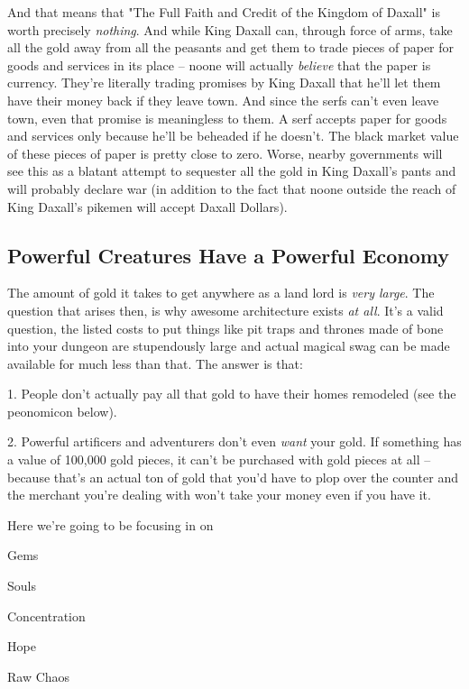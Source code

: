 And that means that "The Full Faith and Credit of the Kingdom of Daxall" is worth precisely \textit{nothing}. And while King Daxall can, through force of arms, take all the gold away from all the peasants and get them to trade pieces of paper for goods and services in its place -- noone will actually \textit{believe} that the paper is currency. They're literally trading promises by King Daxall that he'll let them have their money back if they leave town. And since the serfs can't even leave town, even that promise is meaningless to them. A serf accepts paper for goods and services only because he'll be beheaded if he doesn't. The black market value of these pieces of paper is pretty close to zero. Worse, nearby governments will see this as a blatant attempt to sequester all the gold in King Daxall's pants and will probably declare war (in addition to the fact that noone outside the reach of King Daxall's pikemen will accept Daxall Dollars).

\subsection{Powerful Creatures Have a Powerful Economy}

The amount of gold it takes to get anywhere as a land lord is \textit{very large}. The question that arises then, is why awesome architecture exists \textit{at all}. It's a valid question, the listed costs to put things like pit traps and thrones made of bone into your dungeon are stupendously large and actual magical swag can be made available for much less than that. The answer is that:

1. People don't actually pay all that gold to have their homes remodeled (see the peonomicon below).

2. Powerful artificers and adventurers don't even \textit{want} your gold. If something has a value of 100,000 gold pieces, it can't be purchased with gold pieces at all -- because that's an actual ton of gold that you'd have to plop over the counter and the merchant you're dealing with won't take your money even if you have it.

Here we're going to be focusing in on 

\begin{itemize*}
\item Gems
\item Souls
\item Concentration
\item Hope
\item Raw Chaos
\end{itemize*}

